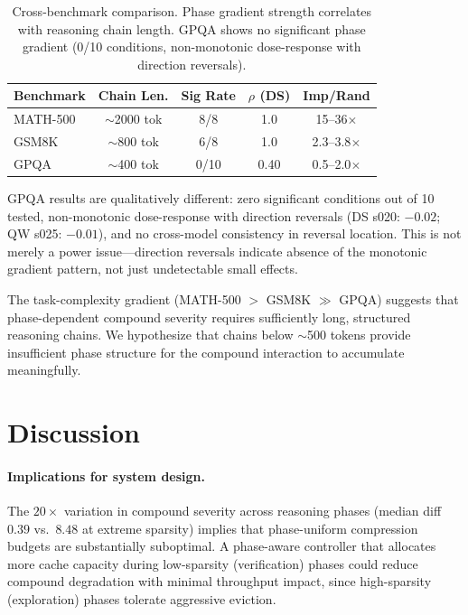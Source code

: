 \documentclass[11pt,a4paper]{article}
\begin{document}
\begin{table}[t]
\centering
\small
\begin{tabular}{lcccc}
\toprule
Benchmark & Chain Len. & Sig Rate & $\rho$ (DS) & Imp/Rand \\
\midrule
MATH-500 & $\sim$2000 tok & 8/8 & 1.0 & 15--36$\times$ \\
GSM8K & $\sim$800 tok & 6/8 & 1.0 & 2.3--3.8$\times$ \\
GPQA & $\sim$400 tok & 0/10 & 0.40 & 0.5--2.0$\times$ \\
\bottomrule
\end{tabular}
\caption{Cross-benchmark comparison. Phase gradient strength correlates with reasoning chain length. GPQA shows no significant phase gradient (0/10 conditions, non-monotonic dose-response with direction reversals).}
\label{tab:crossbench}
\end{table}

GPQA results are qualitatively different: zero significant conditions out of 10 tested, non-monotonic dose-response with direction reversals (DS s020: $-0.02$; QW s025: $-0.01$), and no cross-model consistency in reversal location. This is not merely a power issue---direction reversals indicate absence of the monotonic gradient pattern, not just undetectable small effects.

The task-complexity gradient (MATH-500 $>$ GSM8K $\gg$ GPQA) suggests that phase-dependent compound severity requires sufficiently long, structured reasoning chains. We hypothesize that chains below $\sim$500 tokens provide insufficient phase structure for the compound interaction to accumulate meaningfully.

\section{Discussion}

\paragraph{Implications for system design.} The $20\times$ variation in compound severity across reasoning phases (median diff $0.39$ vs.\ $8.48$ at extreme sparsity) implies that phase-uniform compression budgets are substantially suboptimal. A phase-aware controller that allocates more cache capacity during low-sparsity (verification) phases could reduce compound degradation with minimal throughput impact, since high-sparsity (exploration) phases tolerate aggressive eviction.
\end{document}
